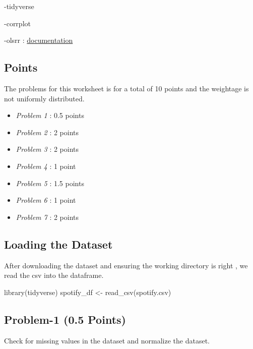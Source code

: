 \documentclass[
]{article}
\newenvironment{Shaded}{\begin{snugshade}}{\end{snugshade}}
\newcommand{\FunctionTok}[1]{\textcolor[rgb]{0.00,0.00,0.00}{#1}}
\newcommand{\NormalTok}[1]{#1}
\newcommand{\OtherTok}[1]{\textcolor[rgb]{0.56,0.35,0.01}{#1}}
\newcommand{\StringTok}[1]{\textcolor[rgb]{0.31,0.60,0.02}{#1}}
\providecommand{\tightlist}{%
  \setlength{\itemsep}{0pt}\setlength{\parskip}{0pt}}
\begin{document}
-tidyverse

-corrplot

-olsrr :
\href{https://www.rdocumentation.org/packages/olsrr/versions/0.5.3}{documentation}

\hypertarget{points}{%
\subsection{Points}\label{points}}

The problems for this worksheet is for a total of 10 points and the
weightage is not uniformly distributed.

\begin{itemize}
\tightlist
\item
  \emph{Problem 1} : 0.5 points
\item
  \emph{Problem 2} : 2 points
\item
  \emph{Problem 3} : 2 points
\item
  \emph{Problem 4} : 1 point
\item
  \emph{Problem 5} : 1.5 points
\item
  \emph{Problem 6} : 1 point
\item
  \emph{Problem 7} : 2 points
\end{itemize}

\hypertarget{loading-the-dataset}{%
\subsection{Loading the Dataset}\label{loading-the-dataset}}

After downloading the dataset and ensuring the working directory is
right , we read the csv into the dataframe.

\begin{Shaded}
\begin{Highlighting}[]
\FunctionTok{library}\NormalTok{(tidyverse)}
\NormalTok{spotify\_df }\OtherTok{\textless{}{-}} \FunctionTok{read\_csv}\NormalTok{(}\StringTok{\textquotesingle{}spotify.csv\textquotesingle{}}\NormalTok{)}
\end{Highlighting}
\end{Shaded}

\hypertarget{problem-1-0.5-points}{%
\subsection{Problem-1 (0.5 Points)}\label{problem-1-0.5-points}}

Check for missing values in the dataset and normalize the dataset.
\end{document}
